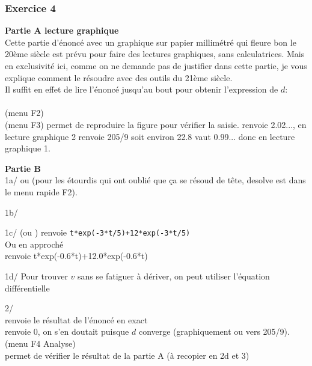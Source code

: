 \documentclass{article}
\begin{document}
\begin{giacjshere}
\subsubsection{Exercice 4}
{\bf Partie A lecture graphique}\\
Cette partie d'énoncé avec un graphique sur papier millimétré qui fleure
bon le 20ème siècle est prévu pour faire des lectures graphiques,
sans calculatrices. Mais en exclusivité ici, comme on ne demande pas 
de justifier dans cette partie, je vous explique comment le résoudre 
avec des outils du 21ème siècle. \\
Il suffit en effet de lire l'énoncé jusqu'au bout pour obtenir 
l'expression de $d$:\\
\\
 (menu F2)\\
 (menu F3) permet de reproduire la figure pour
vérifier la saisie.
 renvoie 2.02..., en lecture graphique 2
 renvoie 205/9 soit environ 22.8
 vaut 0.99... donc en lecture graphique 1.

{\bf Partie B}\\
1a/ 
 ou  (pour les 
étourdis qui ont oublié que ça se résoud de tête, desolve est dans le 
menu rapide F2).

1b/ 

1c/  
(ou )
renvoie {\tt t*exp(-3*t/5)+12*exp(-3*t/5)}\\
Ou en approché\\
renvoie t*exp(-0.6*t)+12.0*exp(-0.6*t)

1d/ Pour trouver $v$ sans se fatiguer à dériver, 
on peut utiliser l'équation différentielle

2/ 
\\
 renvoie le résultat de l'énoncé en exact\\
 renvoie 0, on s'en doutait puisque $d$ converge (graphiquement ou vers 205/9).\\
 (menu F4 Analyse)\\
 permet de vérifier le résultat de la partie A (à recopier en 2d et 3)


\end{giacjshere}
\end{document}
